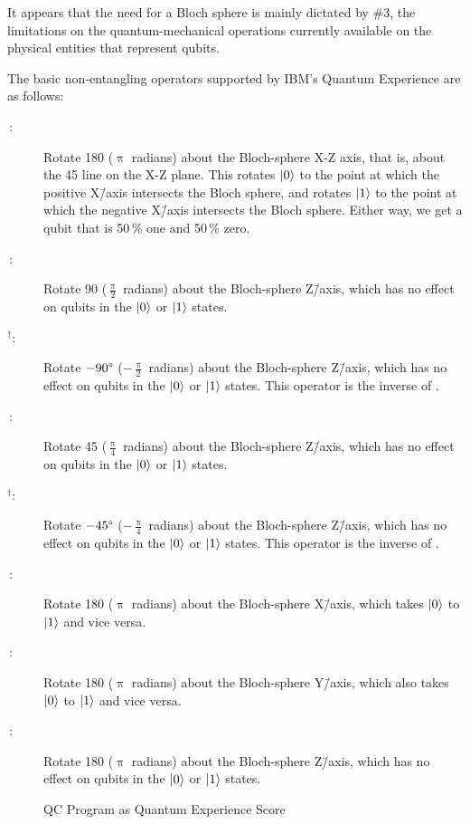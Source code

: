 It appears that the need for a Bloch sphere is mainly dictated by \#3,
the limitations on the quantum-mechanical operations currently available
on the physical entities that represent qubits.

The basic non-entangling operators supported by IBM's Quantum Experience
are as follows:

\begin{description}
\item[\,:]
	Rotate 180\degree{} ($\uppi$ radians) about the Bloch-sphere
	X-Z axis, that is, about the 45\degree{} line on the
	X-Z plane.  This rotates $\ket{0}$ to the point at which the
	positive X\=/axis intersects the Bloch sphere, and rotates $\ket{1}$
	to the point at which the negative X\=/axis intersects the Bloch
	sphere.
	Either way, we get a qubit that is 50\,\% one and 50\,\% zero.
\item[\,:]
	Rotate 90\degree{} ($\frac{\uppi}{2}$ radians) about the
	Bloch-sphere Z\=/axis, which has no effect on qubits in the
	$\ket{0}$ or $\ket{1}$ states.
\item[$^{\bm{\dagger}}$:]
	Rotate $-90\degree$ ($-\frac{\uppi}{2}$ radians) about the
	Bloch-sphere Z\=/axis, which has no effect on qubits in the
	$\ket{0}$ or $\ket{1}$ states.
	This operator is the inverse of .
\item[\,:]
	Rotate 45\degree{} ($\frac{\uppi}{4}$ radians) about the
	Bloch-sphere Z\=/axis, which has no effect on qubits in the
	$\ket{0}$ or $\ket{1}$ states.
\item[$^{\bm{\dagger}}$:]
	Rotate $-45\degree$ ($-\frac{\uppi}{4}$ radians) about the
	Bloch-sphere Z\=/axis, which has no effect on qubits in the
	$\ket{0}$ or $\ket{1}$ states.
	This operator is the inverse of .
\item[\,:]
	Rotate 180\degree{} ($\uppi$ radians) about the Bloch-sphere
	X\=/axis, which takes $\ket{0}$ to $\ket{1}$ and vice versa.
\item[\,:]
	Rotate 180\degree{} ($\uppi$ radians) about the Bloch-sphere
	Y\=/axis, which also takes $\ket{0}$ to $\ket{1}$ and vice versa.
\item[\,:]
	Rotate 180\degree{} ($\uppi$ radians) about the Bloch-sphere
	Z\=/axis, which has no effect on qubits in the $\ket{0}$ or
	$\ket{1}$ states.
\end{description}

\begin{figure}[tb]
\centering
{}
\caption{QC Program as Quantum Experience Score}
\label{fig:future:QC Program as Quantum Experience Score}
\end{figure}


